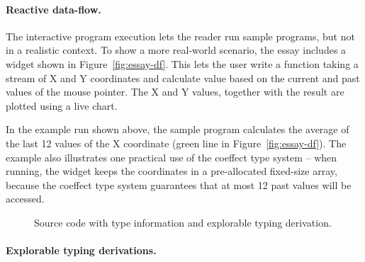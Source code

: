 
\paragraph{Reactive data-flow.}

The interactive program execution lets the reader run sample programs, but not in a realistic
context. To show a more real-world scenario, the essay includes a widget shown in Figure~\ref{fig:essay-df}.
This lets the user write a function taking a stream of X and Y coordinates and calculate value
based on the current and past values of the mouse pointer. The X and Y values, together with the
result are plotted using a live chart.

In the example run shown above, the sample program calculates the average of the last 12 values
of the X coordinate (green line in Figure~\ref{fig:essay-df}). The example also illustrates one
practical use of the coeffect type system -- when running, the widget keeps the coordinates in a
pre-allocated fixed-size array, because the coeffect type system guarantees that at most 12 past
values will be accessed.


\begin{figure}[t]
\caption{Source code with type information and explorable typing derivation.}
\label{fig:essay-typing}
\end{figure}


\paragraph{Explorable typing derivations.}

